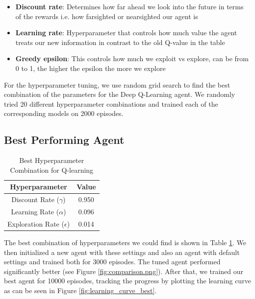 \documentclass[a4paper,12pt]{article}
\begin{document}
\begin{itemize}
    \item \textbf{Discount rate}: Determines how far ahead we look into the future in terms of the rewards i.e. how farsighted or nearsighted our agent is
    \item \textbf{Learning rate}: Hyperparameter that controls how much value the agent treats our new information in contrast to the old Q-value in the table 
    \item \textbf{Greedy epsilon}: This controls how much we exploit vs explore, can be from 0 to 1, the higher the epsilon the more we explore 
\end{itemize}
For the hyperparameter tuning, we use random grid search to find the best combination of the parameters for the Deep Q-Learning agent. We randomly tried 20 different
hyperparameter combinations and trained each of the corresponding models on 2000 episodes.

\subsection{Best Performing Agent}
\begin{table}[h]
    \centering
    \caption{Best Hyperparameter Combination for Q-learning}
    \begin{tabular}{|c|c|}
        \hline
        Hyperparameter & Value \\
        \hline
        Discount Rate (\(\gamma\)) & 0.950 \\
        \hline
        Learning Rate (\(\alpha\)) & 0.096 \\
        \hline
        Exploration Rate (\(\epsilon\)) & 0.014 \\
        \hline
    \end{tabular}
    \label{tab:best_hyperparams}
\end{table}

The best combination of hyperparameters we could find is shown in Table \ref{tab:best_hyperparams}. We then initialized a 
new agent with these settings and also an agent with default settings and trained both for 3000 episodes. The tuned agent 
performed significantly better (see Figure \ref{fig:comparison.png}). After that, we trained our best agent for 10000 episodes, 
tracking the progress by plotting the learning curve as can be seen in Figure \ref{fig:learning_curve_best}.

\end{document}
